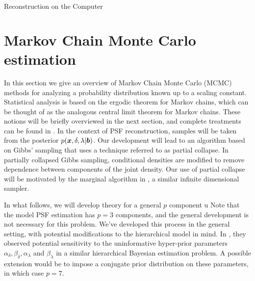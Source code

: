\begin{chapter}{Reconstruction on the Computer}
\section{Markov Chain Monte Carlo estimation} \label{sec:pcgibbs}
In this section we give an overview of Markov Chain Monte Carlo (MCMC) methods for analyzing a probability distribution known up to a scaling constant.
Statistical analysis is based on the ergodic theorem for Markov chains, which can be thought of as the analogous central limit theorem for Markov chains. 
These notions will be briefly overviewed in the next section, and complete treatments can be found in \citep{robert2013monte,liu2008monte}.
In the context of PSF reconstruction, samples will be taken from the posterior $p(\mbox{\boldmath$x$},\delta,\lambda|\mbox{\boldmath$b$})$.
Our development will lead to an algorithm based on Gibbs' sampling that uses a technique referred to as partial collapse.  
In partially collapsed Gibbs sampling, conditional densities are modified to remove dependence between components of the joint density.
Our use of partial collapse will be motivated by the marginal algorithm in \citep{agapiou2014analysis}, a similar infinite dimensional sampler.

In what follows, we will develop theory for a general $p$ component u
Note that the model PSF estimation has $p=3$ components, and the general development is not necessary for this problem.
We've developed this process in the general setting, with potential modifications to the hierarchical model in mind.
In \citep{howard2015Sensitivity}, they observed potential sensitivity to the uninformative hyper-prior parameters $\alpha_\delta,\beta_\delta,\alpha_\lambda$ and $\beta_\lambda$ in a similar hierarchical Bayesian estimation problem.
A possible extension would be to impose a conjugate prior distribution on these parameters, in which case $p=7$.


\end{chapter}
